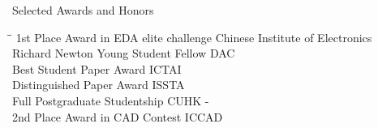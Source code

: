 
\begin{rSection}{Selected Awards and Honors}
\begin{tabbing}
\hspace{3.6in}\= \hspace{2.1in}\= \kill
1st Place Award in EDA elite challenge\> Chinese Institute of Electronics  \\
Richard Newton Young Student Fellow    \> DAC  \\
Best Student Paper Award                       \> ICTAI                       \\
Distinguished Paper Award                      \>ISSTA                      \\
Full Postgraduate Studentship   \>CUHK  -\\
     2nd Place Award in CAD Contest               \> ICCAD                       \\


\end{tabbing}
\end{rSection}
